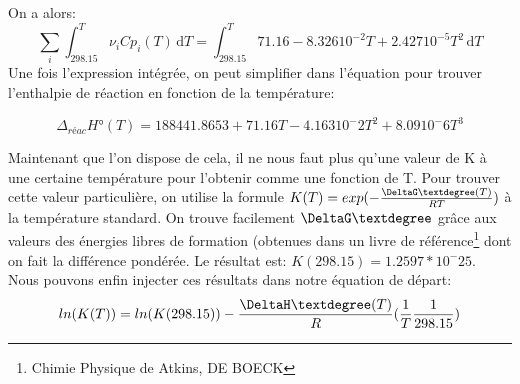 \documentclass[a4paper, oneside, 12pt]{article}
\begin{document}
On a alors:
\begin{equation}
	\sum_i \int_298.15^T \nu_i Cp_i(T) \, \mathrm dT=\int_298.15^T 71.16-8.326 10^{-2}T+2.427 10^{-5}T^2 \, \mathrm dT
\end{equation}
Une fois l'expression intégrée, on peut simplifier dans l'équation pour trouver l'enthalpie de réaction en fonction de la température:

\begin{equation}
	\Delta_{réac}H°(T)=188441.8653+71.16T-4.163 10^-2 T^2 + 8.09 10^-6 T^3
\end{equation}

Maintenant que l'on dispose de cela, il ne nous faut plus qu'une valeur de K à une certaine température pour l'obtenir comme une fonction de T. Pour trouver cette valeur particulière, on utilise la formule $K(T)=exp(-\frac{\DeltaG°(T)}{RT})$ à la température standard. On trouve facilement $\DeltaG°$ grâce aux valeurs des énergies libres de formation (obtenues dans un livre de référence\footnote{Chimie Physique de Atkins, DE BOECK} dont on fait la différence pondérée. Le résultat est: $K(298.15)=1.2597*10^-25$.\\
Nous pouvons enfin injecter ces résultats dans notre équation de départ:
\begin{equation}
	ln(K(T))=ln(K(298.15))-\frac{\DeltaH°(T)}{R}(\frac{1}{T}\frac{1}{298.15})
\end{equation}
\end{document}
